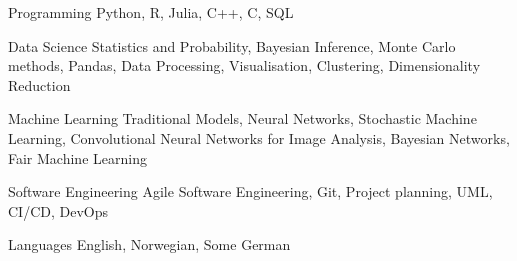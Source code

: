 

\begin{cvskills}

  \cvskill
    {Programming} %
    {Python, R, Julia, C++, C, SQL} %

  \cvskill
    {Data Science} %
    {Statistics and Probability, Bayesian Inference, Monte Carlo methods, Pandas, Data Processing, Visualisation, Clustering, Dimensionality Reduction} %

  \cvskill
    {Machine Learning} %
    {Traditional Models, Neural Networks, Stochastic Machine Learning, \newline Convolutional Neural Networks for Image Analysis, Bayesian Networks, Fair Machine Learning} %

  \cvskill
    {Software Engineering} %
    {Agile Software Engineering, Git, Project planning, UML, CI/CD, DevOps} %

  \cvskill
    {Languages} %
    {English, Norwegian, Some German} %

\end{cvskills}
